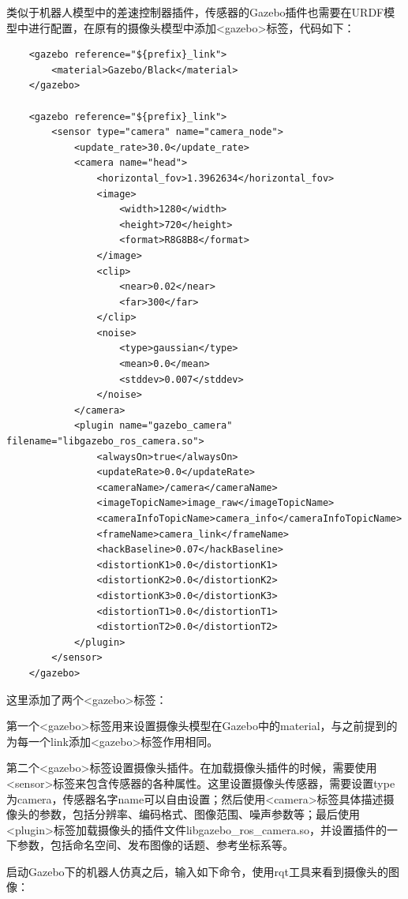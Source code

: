 \documentclass[10pt, oneside]{book}
\begin{document}
类似于机器人模型中的差速控制器插件，传感器的Gazebo插件也需要在URDF模型中进行配置，在原有的摄像头模型中添加<gazebo>标签，代码如下：

\begin{verbatim}
    <gazebo reference="${prefix}_link">
        <material>Gazebo/Black</material>
    </gazebo>

    <gazebo reference="${prefix}_link">
        <sensor type="camera" name="camera_node">
            <update_rate>30.0</update_rate>
            <camera name="head">
                <horizontal_fov>1.3962634</horizontal_fov>
                <image>
                    <width>1280</width>
                    <height>720</height>
                    <format>R8G8B8</format>
                </image>
                <clip>
                    <near>0.02</near>
                    <far>300</far>
                </clip>
                <noise>
                    <type>gaussian</type>
                    <mean>0.0</mean>
                    <stddev>0.007</stddev>
                </noise>
            </camera>
            <plugin name="gazebo_camera" filename="libgazebo_ros_camera.so">
                <alwaysOn>true</alwaysOn>
                <updateRate>0.0</updateRate>
                <cameraName>/camera</cameraName>
                <imageTopicName>image_raw</imageTopicName>
                <cameraInfoTopicName>camera_info</cameraInfoTopicName>
                <frameName>camera_link</frameName>
                <hackBaseline>0.07</hackBaseline>
                <distortionK1>0.0</distortionK1>
                <distortionK2>0.0</distortionK2>
                <distortionK3>0.0</distortionK3>
                <distortionT1>0.0</distortionT1>
                <distortionT2>0.0</distortionT2>
            </plugin>
        </sensor>
    </gazebo>
\end{verbatim}

这里添加了两个<gazebo>标签：

第一个<gazebo>标签用来设置摄像头模型在Gazebo中的material，与之前提到的为每一个link添加<gazebo>标签作用相同。

第二个<gazebo>标签设置摄像头插件。在加载摄像头插件的时候，需要使用<sensor>标签来包含传感器的各种属性。这里设置摄像头传感器，需要设置type为camera，传感器名字name可以自由设置；然后使用<camera>标签具体描述摄像头的参数，包括分辨率、编码格式、图像范围、噪声参数等；最后使用<plugin>标签加载摄像头的插件文件libgazebo\_ros\_camera.so，并设置插件的一下参数，包括命名空间、发布图像的话题、参考坐标系等。

启动Gazebo下的机器人仿真之后，输入如下命令，使用rqt工具来看到摄像头的图像：
\end{document}
